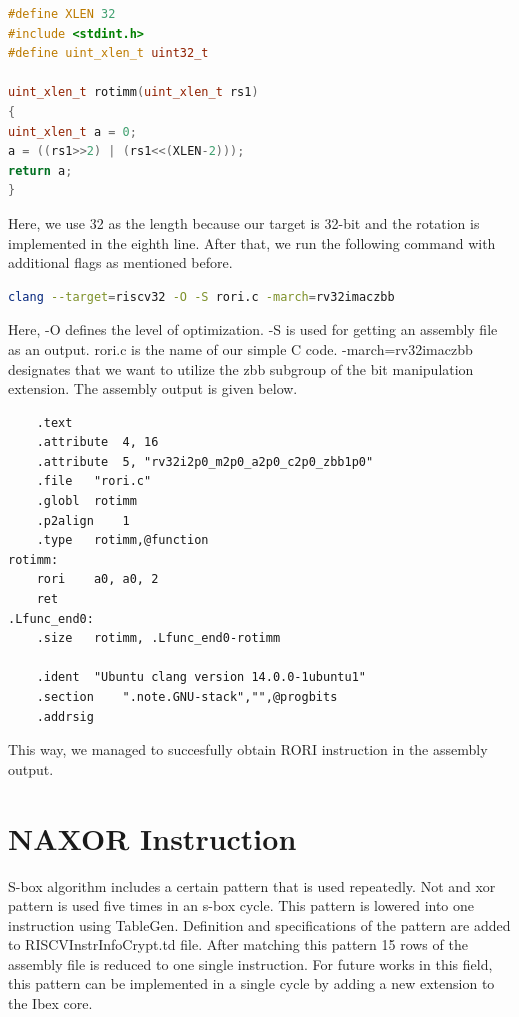 \begin{lstlisting}[language=C++]
#define XLEN 32
#include <stdint.h>
#define uint_xlen_t uint32_t

uint_xlen_t rotimm(uint_xlen_t rs1)
{
uint_xlen_t a = 0;
a = ((rs1>>2) | (rs1<<(XLEN-2)));
return a;
}
\end{lstlisting}

Here, we use 32 as the length because our target is 32-bit and the rotation is implemented in the eighth line. After that, we run the following command with additional flags as mentioned before.

\begin{lstlisting}[language=Bash]
clang --target=riscv32 -O -S rori.c -march=rv32imaczbb
\end{lstlisting}

Here, -O defines the level of optimization. -S is used for getting an assembly file as an output. rori.c is the name of our simple C code. -march=rv32imaczbb designates that we want to utilize the zbb subgroup of the bit manipulation extension. The assembly output is given below.%

\begin{lstlisting}
	.text
	.attribute	4, 16
	.attribute	5, "rv32i2p0_m2p0_a2p0_c2p0_zbb1p0"
	.file	"rori.c"
	.globl	rotimm
	.p2align	1
	.type	rotimm,@function
rotimm:
	rori	a0, a0, 2
	ret
.Lfunc_end0:
	.size	rotimm, .Lfunc_end0-rotimm

	.ident	"Ubuntu clang version 14.0.0-1ubuntu1"
	.section	".note.GNU-stack","",@progbits
	.addrsig
\end{lstlisting}

This way, we managed to succesfully obtain RORI instruction in the assembly output.

\section{NAXOR Instruction}

S-box algorithm includes a certain pattern that is used repeatedly. Not and xor pattern is used five times in an s-box cycle. This pattern is lowered into one instruction using TableGen. Definition and specifications of the pattern are added to RISCVInstrInfoCrypt.td file. After matching this pattern 15 rows of the assembly file is reduced to one single instruction. For future works in this field, this pattern can be implemented in a single cycle by adding a new extension to the Ibex core.  

